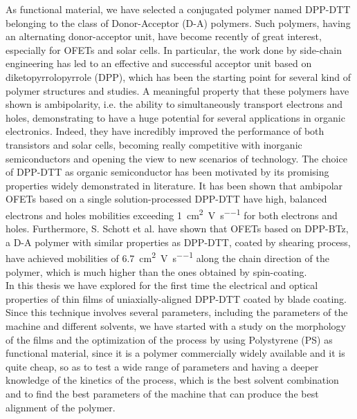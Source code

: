 \documentclass  [
  paper    = a4,
  BCOR     = 10mm,
  twoside,
  fontsize = 12pt,
  fleqn,
  toc      = bibnumbered,
  toc      = listofnumbered,
  numbers  = noendperiod,
  headings = normal,
  listof   = leveldown,
  version  = 3.03
]                                       {scrreprt}
\begin{document}
As functional material, we have selected a conjugated polymer named DPP-DTT belonging to the class of Donor-Acceptor (D-A) polymers. Such polymers, having an alternating donor-acceptor unit, have become recently of great interest, especially for OFETs and solar cells. In particular, the work done by side-chain engineering has led to an effective and successful acceptor unit based on diketopyrrolopyrrole (DPP), which has been the starting point for several kind of polymer structures and studies\cite{art:DA}. A meaningful property that these polymers have shown is ambipolarity, i.e. the ability to simultaneously transport electrons and holes, demonstrating to have a huge potential for several applications in organic electronics. Indeed, they have incredibly improved the performance of both transistors and solar cells, becoming really competitive with inorganic semiconductors and opening the view to new scenarios of technology. The choice of DPP-DTT as organic semiconductor has been motivated by its promising properties widely demonstrated in literature. It has been shown that ambipolar OFETs based on a single solution-processed DPP-DTT have high, balanced electrons and holes mobilities exceeding \SI{1}{\square\centi\metre\per\volt\per\second} for both electrons and holes\cite{art:dppmob}\cite{art:dppmob2017}. Furthermore, S. Schott et al.\cite{art:DPPBTz} have shown that OFETs based on DPP-BTz, a D-A polymer with similar properties as DPP-DTT\cite{art:dppmob2017}, coated by shearing process, have achieved mobilities of \SI{6.7}{\square\centi\metre\per\volt\per\second} along the chain direction of the polymer, which is much higher than the ones obtained by spin-coating\cite{art:dppmobSC}.\\

In this thesis we have explored for the first time the electrical and optical properties of thin films of uniaxially-aligned DPP-DTT coated by blade coating. Since this technique involves several parameters, including the parameters of the machine and different solvents, we have started with a study on the morphology of the films and the optimization of the process by using Polystyrene (PS) as functional material, since it is a polymer commercially widely available and it is quite cheap, so as to test a wide range of parameters and having a deeper knowledge of the kinetics of the process, which is the best solvent combination and to find the best parameters of the machine that can produce the best alignment of the polymer.\\
\end{document}
